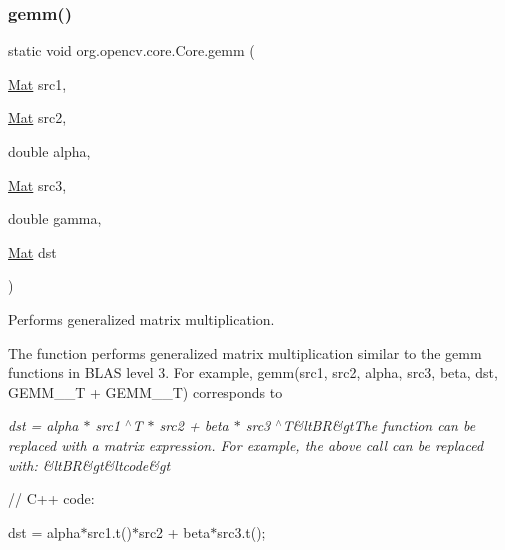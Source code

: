 \subsubsection{\texorpdfstring{gemm()}{gemm()}\hspace{0.1cm}{\footnotesize\ttfamily [2/2]}}
{\footnotesize\ttfamily static void org.\+opencv.\+core.\+Core.\+gemm (\begin{DoxyParamCaption}\item[{\mbox{\hyperlink{classorg_1_1opencv_1_1core_1_1_mat}{Mat}}}]{src1,  }\item[{\mbox{\hyperlink{classorg_1_1opencv_1_1core_1_1_mat}{Mat}}}]{src2,  }\item[{double}]{alpha,  }\item[{\mbox{\hyperlink{classorg_1_1opencv_1_1core_1_1_mat}{Mat}}}]{src3,  }\item[{double}]{gamma,  }\item[{\mbox{\hyperlink{classorg_1_1opencv_1_1core_1_1_mat}{Mat}}}]{dst }\end{DoxyParamCaption})\hspace{0.3cm}{\ttfamily [static]}}

Performs generalized matrix multiplication.

The function performs generalized matrix multiplication similar to the {\ttfamily gemm} functions in B\+L\+AS level 3. For example, {\ttfamily gemm(src1, src2, alpha, src3, beta, dst, G\+E\+M\+M\+\_\+\_\+T + G\+E\+M\+M\+\_\+\_\+T)} corresponds to

{\itshape dst = alpha $\ast$ src1 $^\wedge$T $\ast$ src2 + beta $\ast$ src3 $^\wedge$T\&lt\+BR\&gt\+The function can be replaced with a matrix expression. For example, the above call can be replaced with\+: \&lt\+BR\&gt\&ltcode\&gt}

// C++ code\+:

dst = alpha$\ast$src1.t()$\ast$src2 + beta$\ast$src3.t();


